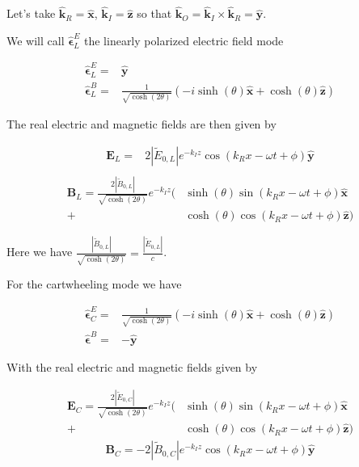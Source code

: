 \documentclass[12pt]{article}
\newcommand{\ep}{\epsilon}
\renewcommand{\vec}[1]{\boldsymbol{#1}}
\newcommand{\unitvec}[1]{\hat{\boldsymbol{#1}}}
\begin{document}
Let's take $\unitvec{k}_R = \unitvec{x}$, $\unitvec{k}_I=\unitvec{z}$ so that $\unitvec{k}_O = \unitvec{k}_I\times\unitvec{k}_R = \unitvec{y}$.



We will call $\unitvec{\ep}^E_L$ the linearly polarized electric field mode

\begin{align}
\unitvec{\ep}^E_L =& \unitvec{y}\\
\unitvec{\ep}^B_L =& \frac{1}{\sqrt{\cosh(2\theta)}}\left(-i\sinh(\theta)\unitvec{x} + \cosh(\theta)\unitvec{z}\right)
\end{align}

The real electric and magnetic fields are then given by

\begin{align}
\vec{E}_L =& 2|\tilde{E}_{0,L}|e^{-k_I z}\cos(k_R x - \omega t + \phi)\unitvec{y}\\
\end{align}
\begin{align}
\vec{B}_L = \frac{2|\tilde{B}_{0,L}|}{\sqrt{\cosh(2\theta)}} e^{-k_I z}\Big(&\sinh(\theta)\sin(k_R x - \omega t + \phi)\unitvec{x}\\
 + &\cosh(\theta)\cos(k_R x- \omega t + \phi)\unitvec{z} \Big)
\end{align}

Here we have $\frac{|\tilde{B}_{0,L}|}{\sqrt{\cosh(2\theta)}} = \frac{|\tilde{E}_{0,L}|}{c}$.

For the cartwheeling mode we have

\begin{align}
\unitvec{\ep}^E_C =& \frac{1}{\sqrt{\cosh(2\theta)}}\left(-i\sinh(\theta)\unitvec{x} + \cosh(\theta)\unitvec{z}\right)\\
\unitvec{\ep}^B =& -\unitvec{y}
\end{align}

With the real electric and magnetic fields given by

\begin{align}
\vec{E}_C = \frac{2|\tilde{E}_{0,C}|}{\sqrt{\cosh(2\theta)}} e^{-k_I z}\Big(&\sinh(\theta)\sin(k_R x - \omega t + \phi)\unitvec{x}\\
+&\cosh(\theta)\cos(k_R x - \omega t + \phi)\unitvec{z}\Big)
\end{align}
\begin{align}
\vec{B}_C = -2|\tilde{B}_{0,C}| e^{-k_I z}\cos(k_R x - \omega t + \phi) \unitvec{y}
\end{align}
\end{document}
